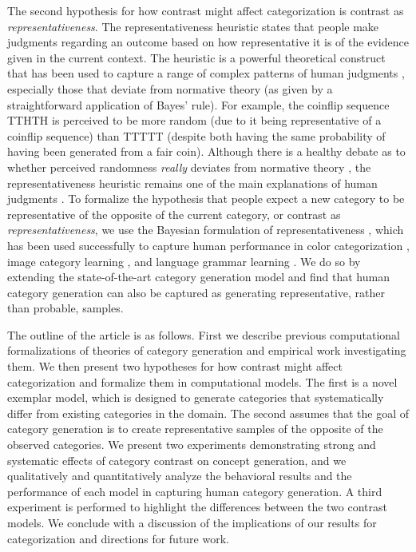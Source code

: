 \documentclass[pdflatex,sn-apa]{sn-jnl}%
\theoremstyle{thmstyleone}%
\theoremstyle{thmstyletwo}%
\theoremstyle{thmstylethree}%
\begin{document}
The second hypothesis for how contrast might affect categorization is contrast
as {\em representativeness}. The representativeness heuristic
\citep{kahneman1972subjective} states that people make judgments regarding an
outcome based on how representative it is of the evidence given in the current
context. The heuristic is a powerful theoretical construct that has been used to
capture a range of complex patterns of human judgments
\citep{kahneman73,tversky74,tversky83}, especially those that deviate from
normative theory (as given by a straightforward application of Bayes' rule). For
example, the coinflip sequence TTHTH is perceived to be more random (due to it
being representative of a coinflip sequence) than TTTTT (despite both having the
same probability of having been generated from a fair coin). Although there is a
healthy debate as to whether perceived randomness {\em really} deviates from
normative theory \citep{griffiths18,hahn09}, the representativeness heuristic
remains one of the main explanations of human judgments \citep{reimers18}. To
formalize the hypothesis that people expect a new category to be representative
of the opposite of the current category, or contrast as {\em
  representativeness}, we use the Bayesian formulation of representativeness
\citep{tenenbaum01}, which has been used successfully to capture human
performance in color categorization \citep{abbott16}, image category learning
\citep{abbott11}, and language grammar learning \citep{rafferty10}. We do so by
extending the state-of-the-art category generation model
\citep{jern2013probabilistic} and find that human category generation can
also be captured as generating representative, rather than probable, samples.

The outline of the article is as follows. First we describe previous
computational formalizations of theories of category generation and empirical
work investigating them. We then present two hypotheses for how contrast might
affect categorization and formalize them in computational models. The first is a
novel exemplar model, which is designed to generate categories that
systematically differ from existing categories in the domain. The second assumes
that the goal of category generation is to create representative samples of the
opposite of the observed categories. We present two experiments demonstrating
strong and systematic effects of category contrast on concept generation, and we
qualitatively and quantitatively analyze the behavioral results and the performance of each model in
capturing human category generation. A third experiment is performed to
highlight the differences between the two contrast models. We conclude with a
discussion of the implications of our results for categorization and directions
for future work.
\end{document}

